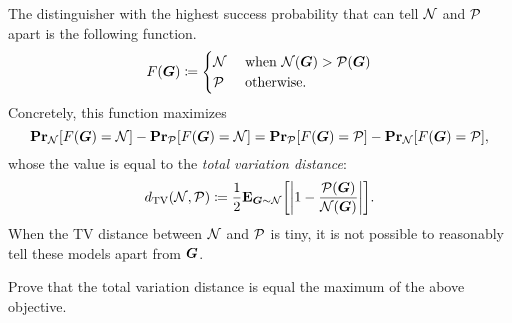 \documentclass[11pt, letterpaper]{article}
\newcommand{\Null}{\calN}
\newcommand{\Planted}{\calP}
\begin{document}
The distinguisher with the highest success probability that can tell $\Null$ and $\Planted$ apart is the following function.
\begin{align*}
    F(\bG) \coloneqq
    \begin{cases}
        \Null &\text{ when $\Null(\bG) > \Planted(\bG)$} \\
        \Planted &\text{ otherwise.}
    \end{cases}
\end{align*}
Concretely, this function maximizes $$\Pr_{\Null}[F(\bG) = \Null] - \Pr_{\Planted}[F(\bG) = \Null] = \Pr_{\Planted}[F(\bG) = \Planted] - \Pr_{\Null}[F(\bG) = \Planted],$$ whose the value is equal to the \emph{total variation distance}:
\[
    d_{\mathrm{TV}}(\Null,\Planted) \coloneqq \frac{1}{2}\E_{\bG\sim\Null}\bracks*{\abs*{ 1 - \frac{\Planted(\bG)}{\Null(\bG)} }}.
\]
When the TV distance between $\Null$ and $\Planted$ is tiny, it is not possible to reasonably tell these models apart from $\boldsymbol{G}$.

\begin{tcolorbox}[arc=3mm,colback=White,coltext=Black,boxrule=1pt]
    \begin{exercise}
        Prove that the total variation distance is equal the maximum of the above objective.
    \end{exercise}
\end{tcolorbox}
\end{document}
